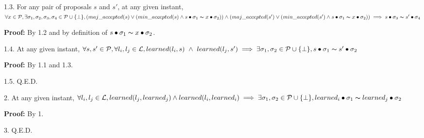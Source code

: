 \indent\indent\indent\parbox{\linewidth-\algorithmicindent*3}{\strut1.3. For any pair of proposals $s$ and $s'$, at any given instant, $\forall x \in \mathcal{P}, \exists \sigma_1,\sigma_2,\sigma_3,\sigma_4 \in \mathcal{P} \cup \{\bot\}, (maj\_accepted(s) \lor (min\_accepted(s) \land s \bullet \sigma_1 \thicksim x \bullet \sigma_2)) \land (maj\_accepted(s') \lor (min\_accepted(s') \land s \bullet \sigma_1 \thicksim x \bullet \sigma_2)) \implies s \bullet \sigma_3 \thicksim s' \bullet \sigma_4$}\par
\indent\indent\indent\indent\parbox{\linewidth}{\strut\textbf{Proof:} By 1.2 and by definition of $s \bullet \sigma_1 \thicksim x \bullet \sigma_2$.}\par
\indent\indent\indent\parbox{\linewidth-\algorithmicindent*3}{\strut1.4. At any given instant, $\forall s,s' \in \mathcal{P}, \forall l_i,l_j \in \mathcal{L}, learned(l_i,s)\ \land\ learned(l_j,s') \implies \exists \sigma_1,\sigma_2 \in \mathcal{P} \cup \{\bot\}, s \bullet \sigma_1 \thicksim s' \bullet \sigma_2$ }\par
\indent\indent\indent\indent\parbox{\linewidth}{\strut\textbf{Proof:} By 1.1 and 1.3.}\par
\indent\indent\indent\parbox{\linewidth}{\strut1.5. Q.E.D. }\par
\parbox{\linewidth-\algorithmicindent*3}{\strut2. At any given instant, $\forall l_i,l_j \in \mathcal{L}, learned(l_j,learned_j) \land learned(l_i,learned_i) \implies \exists \sigma_1,\sigma_2 \in \mathcal{P} \cup \{\bot\}, learned_i \bullet \sigma_1 \thicksim learned_j \bullet \sigma_2$}\par
\indent\indent\parbox{\linewidth}{\strut\textbf{Proof:} By 1.}\par
\parbox{\linewidth}{\strut3. Q.E.D.} \par
